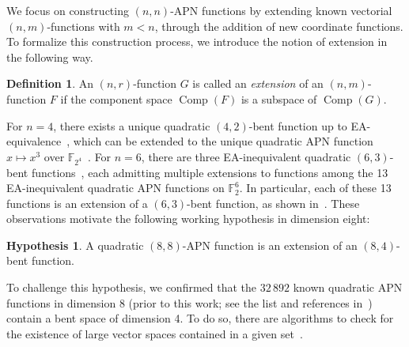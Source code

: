\documentclass{amsart}[11pt]
\theoremstyle{plain}
\theoremstyle{definition}
\newtheorem{definition}[theorem]{Definition}
\newtheorem{hypothesis}[theorem]{Hypothesis}
\numberwithin{theorem}{section}
\numberwithin{equation}{section}
\numberwithin{table}{section}
\numberwithin{figure}{section}
\numberwithin{algorithm}{section}
\begin{document}
We focus on constructing $(n, n)$-APN functions by extending known vectorial $(n, m)$-functions with $m < n$, through the addition of new coordinate functions. To formalize this construction process, we introduce the notion of extension in the following way.

\begin{definition}
	An $(n,r)$-function $G$ is called an \emph{extension} of an $(n,m)$-function $F$ if the component space $\operatorname{Comp}(F)$ is a subspace of $\operatorname{Comp}(G)$.
\end{definition}

For $n=4$, there exists a unique quadratic $(4,2)$-bent function up to EA-equivalence~\cite{DingMT19}, which can be extended to the unique quadratic APN function $x \mapsto x^3$ over $\mathbb{F}_{2^4}$~\cite{DBLP:journals/dcc/BrinkmannL08}. For $n=6$, there are three EA-inequivalent quadratic $(6,3)$-bent functions~\cite[Theorem 3.1]{Arshad_PhD_Thesis}, each admitting multiple extensions to functions among the 13 EA-inequivalent quadratic APN functions on $\mathbb{F}_2^6$. In particular, each of these 13 functions is an extension of a $(6,3)$-bent function, as shown in~\cite[Table 3.1]{Arshad_PhD_Thesis}. These observations motivate the following working hypothesis in dimension eight:

\begin{hypothesis}\label{hypothesis}
    A quadratic $(8,8)$-APN function is an extension of an $(8,4)$-bent function. 
\end{hypothesis}

To challenge this hypothesis, we confirmed that the $32\,892$ known quadratic APN functions in dimension 8 (prior to this work; see the list and references in~\cite[Sec.\@ 4]{DBLP:journals/dcc/BeierleLP22}) contain a bent space of dimension 4. To do so, there are algorithms to check for the existence of large vector spaces contained in a given set~\cite{DBLP:conf/asiacrypt/BonnetainPT19,GologluPavlu2021}.
\end{document}
